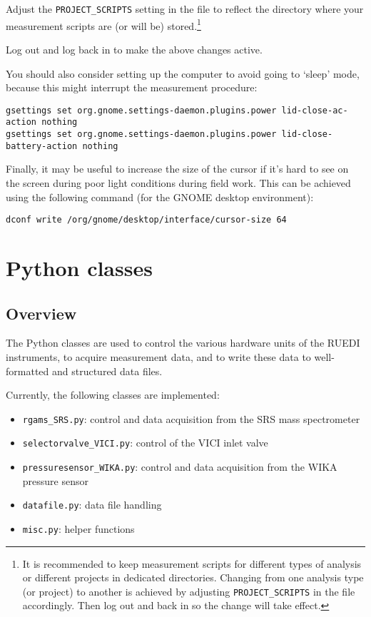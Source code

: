 \documentclass[12pt]{article}   	%
\begin{document}
\begin{enumerate}
Adjust the \texttt{PROJECT_SCRIPTS} setting in the  file to reflect the directory where your measurement scripts are (or will be) stored.\footnote{It is recommended to keep measurement scripts for different types of analysis or different projects in dedicated directories. Changing from one analysis type (or project) to another is achieved by adjusting \texttt{PROJECT_SCRIPTS} in the  file accordingly. Then log out and back in so the change will take effect.}

\end{enumerate}

Log out and log back in to make the above changes active.\par

You should also consider setting up the computer to avoid going to `sleep' mode, because this might interrupt the measurement procedure:\par

{\scriptsize
\mbox{\texttt{gsettings set org.gnome.settings-daemon.plugins.power lid-close-ac-action \textsc{}nothing\textsc{}}}\\
\mbox{\texttt{gsettings set org.gnome.settings-daemon.plugins.power lid-close-battery-action \textsc{}nothing\textsc{}}}
}

Finally, it may be useful to increase the size of the cursor if it's hard to see on the screen during poor light conditions during field work. This can be achieved using the following command (for the GNOME desktop environment):\par
\mbox{\texttt{dconf write /org/gnome/desktop/interface/cursor-size 64}}


\section{Python classes}
\subsection{Overview}
The Python classes are used to control the various hardware units of the RUEDI instruments, to acquire measurement data, and to write these data to well-formatted and structured data files.\par

Currently, the following classes are implemented:
\begin{itemize}
\item \texttt{rgams\_SRS.py}: control and data acquisition from the SRS mass spectrometer
\item \texttt{selectorvalve\_VICI.py}: control of the VICI inlet valve
\item \texttt{pressuresensor\_WIKA.py}: control and data acquisition from the WIKA pressure sensor
\item \texttt{datafile.py}: data file handling
\item \texttt{misc.py}: helper functions
\end{itemize}
\end{document}
